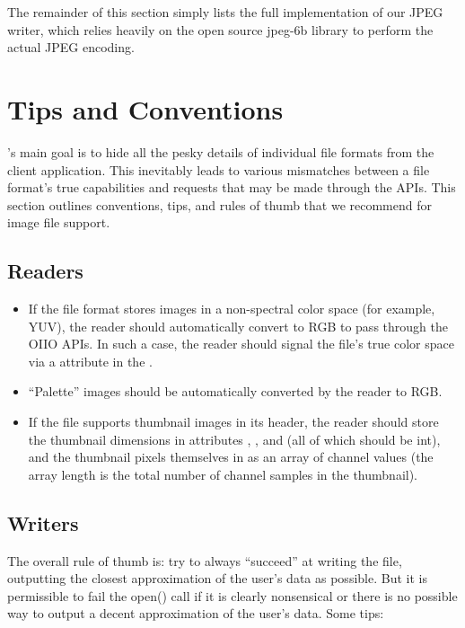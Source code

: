 \bigskip
\bigskip

\noindent
The remainder of this section simply lists the full implementation of
our JPEG writer, which relies heavily on the open source {\fn jpeg-6b}
library to perform the actual JPEG encoding.



\section{Tips and Conventions}
\label{sec:plugintipsconventions}

\product's main goal is to hide all the pesky details of individual file
formats from the client application.  This inevitably leads to various
mismatches between a file format's true capabilities and requests that
may be made through the \product APIs.  This section outlines
conventions, tips, and rules of thumb that we recommend for image file
support.

\subsection*{Readers}
\begin{itemize}
\item If the file format stores images in a non-spectral color space
  (for example, YUV), the reader should automatically convert to RGB to
  pass through the OIIO APIs.  In such a case, the reader should signal
  the file's true color space via a  attribute in
  the \ImageSpec.
\item ``Palette'' images should be automatically converted by the reader
  to RGB.
\item If the file supports thumbnail images in its header, the reader
  should store the thumbnail dimensions in attributes
  , , and
   (all of which should be {\cf int}), and the
  thumbnail pixels themselves in  as an array of
  channel values (the array length is the total number of channel
  samples in the thumbnail).
\end{itemize}

\subsection*{Writers}

The overall rule of thumb is: try to always ``succeed'' at writing the
file, outputting the closest approximation of the user's data as
possible.  But it is permissible to fail the {\cf open()} call if it is
clearly nonsensical or there is no possible way to output a decent
approximation of the user's data.  Some tips:

